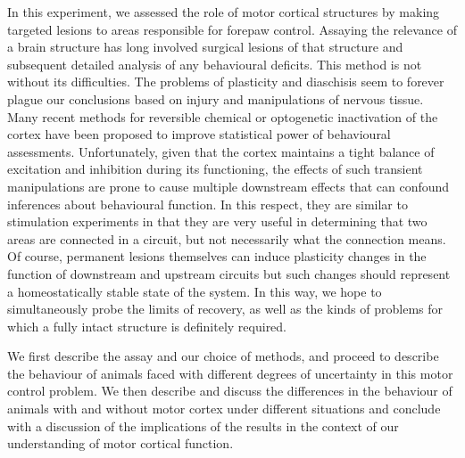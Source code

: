 In this experiment, we assessed the role of motor cortical structures by making targeted lesions to areas responsible for forepaw control. Assaying the relevance of a brain structure has long involved surgical lesions of that structure and subsequent detailed analysis of any behavioural deficits. This method is not without its difficulties. The problems of plasticity and diaschisis seem to forever plague our conclusions based on injury and manipulations of nervous tissue. Many recent methods for reversible chemical or optogenetic inactivation of the cortex have been proposed to improve statistical power of behavioural assessments. Unfortunately, given that the cortex maintains a tight balance of excitation and inhibition during its functioning, the effects of such transient manipulations are prone to cause multiple downstream effects that can confound inferences about behavioural function. In this respect, they are similar to stimulation experiments in that they are very useful in determining that two areas are connected in a circuit, but not necessarily what the connection means. Of course, permanent lesions themselves can induce plasticity changes in the function of downstream and upstream circuits but such changes should represent a homeostatically stable state of the system. In this way, we hope to simultaneously probe the limits of recovery, as well as the kinds of problems for which a fully intact structure is definitely required.

We first describe the assay and our choice of methods, and proceed to describe the behaviour of animals faced with different degrees of uncertainty in this motor control problem. We then describe and discuss the differences in the behaviour of animals with and without motor cortex under different situations and conclude with a discussion of the implications of the results in the context of our understanding of motor cortical function.
